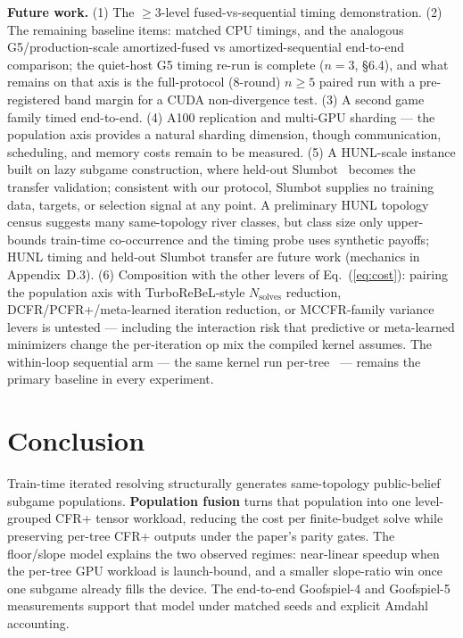 \documentclass[11pt]{article}
\begin{document}
\textbf{Future work.} (1) The $\geq$3-level fused-vs-sequential timing demonstration.
(2) The remaining baseline items: matched CPU timings, and the analogous
G5/production-scale amortized-fused vs amortized-sequential end-to-end comparison; the
quiet-host G5 timing re-run is complete ($n{=}3$, \S6.4), and what remains on that axis
is the full-protocol (8-round) $n \ge 5$ paired run with a pre-registered band margin
for a CUDA non-divergence test. (3) A second game family timed end-to-end. (4) A100
replication and multi-GPU sharding --- the population axis provides a natural sharding
dimension, though communication, scheduling, and memory costs remain to be measured.
(5) A HUNL-scale instance built on lazy subgame construction, where
held-out Slumbot~\citep{Jackson2013} becomes the transfer validation; consistent with
our protocol, Slumbot supplies no training data, targets, or selection signal at any
point. A preliminary HUNL topology census suggests many same-topology river classes,
but class size only upper-bounds train-time co-occurrence and the timing probe uses
synthetic payoffs; HUNL timing and held-out Slumbot transfer are future work (mechanics
in Appendix~D.3). (6) Composition with the other
levers of Eq.~(\ref{eq:cost}): pairing the population axis with TurboReBeL-style
$N_{\text{solves}}$ reduction, DCFR/PCFR+/meta-learned iteration reduction, or
MCCFR-family variance levers is untested --- including the interaction risk that
predictive or meta-learned minimizers change the per-iteration op mix the compiled
kernel assumes. The within-loop sequential arm --- the same kernel run
per-tree~\citep{Kim2024} --- remains the primary baseline in every experiment.

\section{Conclusion}

Train-time iterated resolving structurally generates same-topology public-belief
subgame populations. \textbf{Population fusion} turns that population into one
level-grouped CFR+ tensor workload, reducing the cost per finite-budget solve while
preserving per-tree CFR+ outputs under the paper's parity gates. The floor/slope model
explains the two observed regimes: near-linear speedup when the per-tree GPU workload is
launch-bound, and a smaller slope-ratio win once one subgame already fills the device.
The end-to-end Goofspiel-4 and Goofspiel-5 measurements support that model under matched
seeds and explicit Amdahl accounting.
\end{document}
